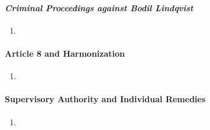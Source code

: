 \paragraph{\emph{Criminal Proceedings against Bodil Lindqvist}} %

\begin{enumerate}
    \item
\end{enumerate}

\paragraph{Article 8 and Harmonization} %

\begin{enumerate}
    \item 
\end{enumerate}

\paragraph{Supervisory Authority and Individual Remedies} %

\begin{enumerate}
    \item
\end{enumerate}

